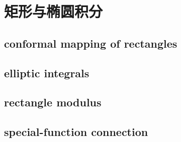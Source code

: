 \section{矩形与椭圆积分}
\label{b3:sec:0704}


\subsection{conformal mapping of rectangles}
\label{b3:subsec:070401}

\subsection{elliptic integrals}
\label{b3:subsec:070402}

\subsection{rectangle modulus}
\label{b3:subsec:070403}

\subsection{special-function connection}
\label{b3:subsec:070404}


